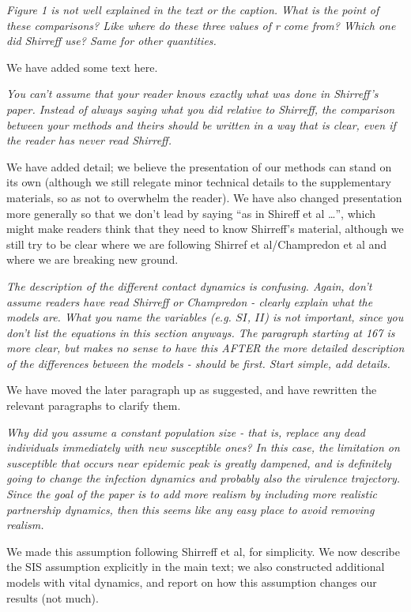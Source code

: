 \documentclass[10pt]{letter}
\newcommand{\revcomment}[1]{\emph{#1}}
\newcommand{\response}[1]{#1}
\begin{document}
\begin{letter}{
}
\revcomment{
Figure 1 is not well explained in the text or the caption. What is the point of these comparisons? Like where do these three values of r come from? Which one did Shirreff use? Same for other quantities.
}

\response{We have added some text here.}

\revcomment{
You can’t assume that your reader knows exactly what was done in Shirreff’s paper. Instead of always saying what you did relative to Shirreff, the comparison between your methods and theirs should be written in a way that is clear, even if the reader has never read Shirreff.
}

\response{We have added detail; we believe the presentation of our methods can stand on its own
(although we still relegate minor technical details to the supplementary materials, so as not
to overwhelm the reader). We have also changed presentation more generally so that we don't lead by
saying ``as in Shireff et al \ldots'', which might make readers think that they need to know Shirreff's
material, although we still try to be clear where we are following Shirref et al/Champredon et al and
where we are breaking new ground.}

\revcomment{
The description of the different contact dynamics is confusing. Again, don’t assume readers have read Shirreff or Champredon - clearly explain what the models are. What you name the variables (e.g. $SI$, $II$) is not important, since you don’t list the equations in this section anyways. The paragraph starting at 167 is more clear, but makes no sense to have this AFTER the more detailed description of the differences between the models - should be first. Start simple, add details.
}

\response{
We have moved the later paragraph up as suggested, and have rewritten the relevant paragraphs to clarify them.
}

\revcomment{
Why did you assume a constant population size - that is, replace any dead individuals immediately with new susceptible ones? In this case, the limitation on susceptible that occurs near epidemic peak is greatly dampened, and is definitely going to change the infection dynamics and probably also the virulence trajectory. Since the goal of the paper is to add more realism by including more realistic partnership dynamics, then this seems like any easy place to avoid removing realism.
}

\response{
We made this assumption following Shirreff et al, for simplicity. We now describe the SIS assumption explicitly in the main text; we also constructed additional models with vital dynamics, and report on how this assumption changes our results (not much).
}


\end{letter}
\end{document}
